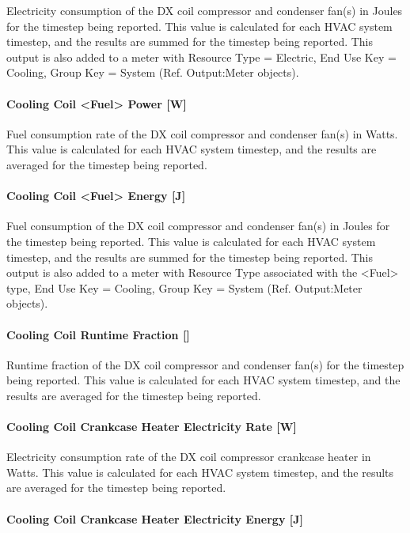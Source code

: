 Electricity consumption of the DX coil compressor and condenser fan(s) in Joules for the timestep being reported. This value is calculated for each HVAC system timestep, and the results are summed for the timestep being reported. This output is also added to a meter with Resource Type = Electric, End Use Key = Cooling, Group Key = System (Ref. Output:Meter objects).

\paragraph{Cooling Coil <Fuel> Power {[}W{]}}

Fuel consumption rate of the DX coil compressor and condenser fan(s) in Watts. This value is calculated for each HVAC system timestep, and the results are averaged for the timestep being reported.

\paragraph{Cooling Coil <Fuel> Energy {[}J{]}}

Fuel consumption of the DX coil compressor and condenser fan(s) in Joules for the timestep being reported. This value is calculated for each HVAC system timestep, and the results are summed for the timestep being reported. This output is also added to a meter with Resource Type associated with the <Fuel> type, End Use Key = Cooling, Group Key = System (Ref. Output:Meter objects).

\paragraph{Cooling Coil Runtime Fraction {[]}}

Runtime fraction of the DX coil compressor and condenser fan(s) for the timestep being reported. This value is calculated for each HVAC system timestep, and the results are averaged for the timestep being reported.

\paragraph{Cooling Coil Crankcase Heater Electricity Rate {[}W{]}}

Electricity consumption rate of the DX coil compressor crankcase heater in Watts. This value is calculated for each HVAC system timestep, and the results are averaged for the timestep being reported.

\paragraph{Cooling Coil Crankcase Heater Electricity Energy {[}J{]}}

